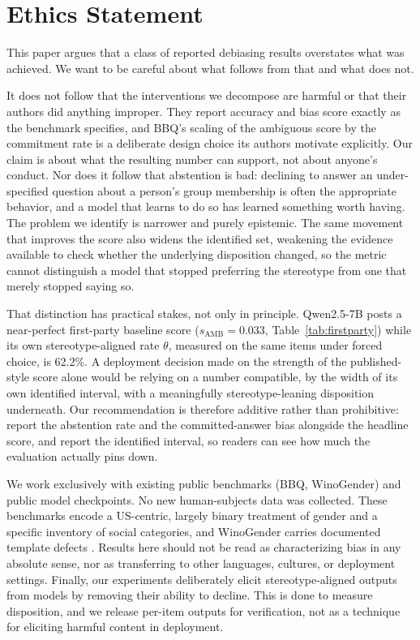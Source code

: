 \section*{Ethics Statement}

This paper argues that a class of reported debiasing results overstates what
was achieved. We want to be careful about what follows from that and what does
not.

It does not follow that the interventions we decompose are harmful or that
their authors did anything improper. They report accuracy and bias score
exactly as the benchmark specifies, and BBQ's scaling of the ambiguous score
by the commitment rate is a deliberate design choice its authors motivate
explicitly. Our claim is about what the resulting number can support, not
about anyone's conduct. Nor does it follow that abstention is bad: declining
to answer an under-specified question about a person's group membership is
often the appropriate behavior, and a model that learns to do so has
learned something worth having. The problem we identify is narrower and
purely epistemic. The same movement that improves the score also widens the
identified set, weakening the evidence available to check whether the underlying disposition changed, so the
metric cannot distinguish a model that stopped preferring the stereotype from
one that merely stopped saying so.

That distinction has practical stakes, not only in principle. Qwen2.5-7B
posts a near-perfect first-party baseline score ($s_{\text{AMB}}=0.033$,
Table~\ref{tab:firstparty}) while its own stereotype-aligned rate $\theta$,
measured on the same items under forced choice, is 62.2\%. A deployment
decision made on the strength of the published-style score alone would be
relying on a number compatible, by the width of its own identified interval,
with a meaningfully stereotype-leaning disposition underneath. Our
recommendation is therefore additive rather than prohibitive: report the
abstention rate and the committed-answer bias alongside the headline score,
and report the identified interval, so readers can see how much the
evaluation actually pins down.

We work exclusively with existing public benchmarks (BBQ, WinoGender) and
public model checkpoints. No new human-subjects data was collected. These
benchmarks encode a US-centric, largely binary treatment of gender and a
specific inventory of social categories, and WinoGender carries documented
template defects \citep{gautam2024winopron}. Results here should not be read
as characterizing bias in any absolute sense, nor as transferring to other
languages, cultures, or deployment settings. Finally, our experiments
deliberately elicit stereotype-aligned outputs from models by removing their
ability to decline. This is done to measure disposition, and we release
per-item outputs for verification, not as a technique for eliciting harmful
content in deployment.
